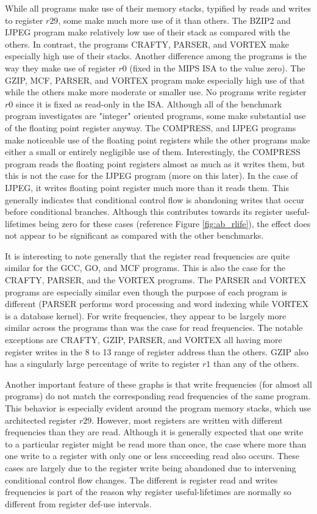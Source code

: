 \documentclass[10pt,dvips]{article}
\begin{document}
While all programs make use of their memory stacks, typified by
reads and writes to register $ r29 $, some make much more use of it
than others.  The BZIP2 and IJPEG program make relatively low use
of their stack as compared with the others.  In contrast, the programs
CRAFTY, PARSER, and VORTEX make especially high use of their stacks.
Another difference among the programs is the way they make use of
register $ r0 $ (fixed in the MIPS ISA to the value zero).
The GZIP, MCF, PARSER, and VORTEX program make especially high
use of that while the others make more moderate or smaller use.
No programs write register $ r0 $ since it is fixed as read-only in the ISA.
Although all of the benchmark program investigates are "integer"
oriented programs, some make substantial use of the floating
point register anyway.  The COMPRESS, and IJPEG programs make
noticeable use of the floating point registers while the other programs
make either a small or entirely negligible use of them.
Interestingly, the COMPRESS program reads the 
floating point registers almost as much as it writes them, but 
this is not the case for the IJPEG program (more on this later).
In the case of IJPEG, it writes floating point register much more than
it reads them.  This generally indicates that conditional control flow is
abandoning writes that occur before conditional branches.
Although this contributes towards its register useful-lifetimes being
zero for these cases (reference Figure \ref{fig:ab_rlife}), 
the effect does not appear to be significant as compared with the
other benchmarks.

It is interesting to note generally that the register read frequencies
are quite similar for the GCC, GO, and MCF programs.
This is also the case for the CRAFTY, PARSER, and the VORTEX
programs.  The PARSER and VORTEX programs are especially
similar even though the purpose of each program is different
(PARSER performs word processing and word indexing 
while VORTEX is a database kernel).
For write frequencies, they appear to be 
largely more similar across the programs than was the case for read
frequencies.  The notable exceptions are CRAFTY, GZIP, PARSER, and 
VORTEX all having more register writes in the 8 to 13 range of
register address than the others.  GZIP also has a singularly large
percentage of write to register $ r1 $ than any of the others.

Another important feature of these graphs is that write frequencies
(for almost all programs) do not match the corresponding read
frequencies of the same program.  This behavior is especially
evident around the program memory stacks, which use architected register
$ r29 $.
However, most registers are written with different frequencies than
they are read.  
Although it is generally expected that one write to a particular
register might be read more than once, the case where more than one
write
to a register with only one or less succeeding read also occurs.
These cases are largely due to the register write being abandoned
due to intervening conditional control flow changes.
The different is register read and writes frequencies
is part of the reason why register useful-lifetimes
are normally so different from register def-use intervals.
\end{document}
